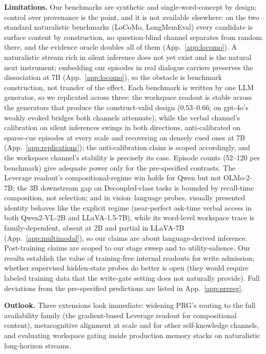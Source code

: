 \textbf{Limitations.}
Our benchmarks are synthetic and single-word-concept by design; control over
provenance is the point, and it is not available elsewhere: on the two
standard naturalistic benchmarks (LoCoMo, LongMemEval) every candidate is
surface content by construction, no question-blind channel separates from
random there, and the evidence oracle doubles all of them
(App.~\ref{app:locomo}). A naturalistic stream rich in silent inference does
not yet exist and is the natural next instrument; embedding our episodes in
real dialogue carriers preserves the dissociation at 7B
(App.~\ref{app:locomo}), so the obstacle is benchmark construction, not
transfer of the effect. Each benchmark is written by one LLM generator, so we replicated across
three: the workspace readout is stable across the generators that produce the
construct-valid design ($0.53$--$0.66$; on gpt-4o's weakly evoked bridges both
channels attenuate), while the verbal channel's calibration on silent
inferences swings in both directions, anti-calibrated on sparse-cue episodes
at every scale and recovering on densely cued ones at 7B
(App.~\ref{app:replications}); the anti-calibration claim is scoped
accordingly, and the workspace channel's stability is precisely its case.
Episode counts (52--120 per benchmark) give adequate power only for the
pre-specified contrasts. The Leverage readout's compositional-regime win holds
for Qwen but not OLMo-2-7B; the 3B downstream gap on Decoupled-class tasks is bounded by
recall-time composition, not selection; and in vision--language probes, visually presented
identity behaves like the explicit regime (near-perfect ask-time verbal access
in both Qwen2-VL-2B and LLaVA-1.5-7B), while its word-level workspace trace is
family-dependent, absent at 2B and partial in LLaVA-7B
(App.~\ref{app:multimodal}), so our claims are about language-derived
inference. Post-training claims are scoped to our stage sweep and to utility-salience. Our
results establish the value of training-free internal readouts for write
admission; whether supervised hidden-state probes do better is open (they would
require labeled training data that the write-gate setting does not naturally
provide). Full deviations from the pre-specified
predictions are listed in App.~\ref{app:prereg}.

\textbf{Outlook.}
Three extensions look immediate: widening PRG's routing to the full
availability family (the gradient-based Leverage readout for compositional
content), metacognitive alignment at scale and for other self-knowledge
channels, and evaluating workspace gating inside production memory stacks on
naturalistic long-horizon streams.
